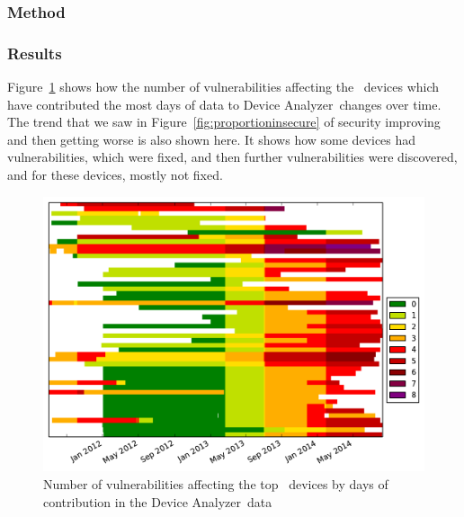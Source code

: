 \documentclass[conference,a4paper,twoside]{IEEEtran}
\let\OldTodo\todo
\renewcommand{\todo}{\OldTodo[inline]}
\newcommand{\da}{Device Analyzer}
\begin{document}
\subsubsection{Method}
\todo{write a method}
\subsubsection{Results}
Figure~\ref{fig:device_data} shows how the number of vulnerabilities affecting the \daNumDeviceDataDevices\ devices which have contributed the most days of data to \da\ changes over time.
The trend that we saw in Figure~\ref{fig:proportioninsecure} of security improving and then getting worse is also shown here.
It shows how some devices had vulnerabilities, which were fixed, and then further vulnerabilities were discovered, and for these devices, mostly not fixed.
\begin{figure}
 \includegraphics[width=\columnwidth]{figures/device-data-all-security}
 \caption{Number of vulnerabilities affecting the top \daNumDeviceDataDevices\ devices by days of contribution in the \da\ data}
 \label{fig:device_data}
\end{figure}
\end{document}
